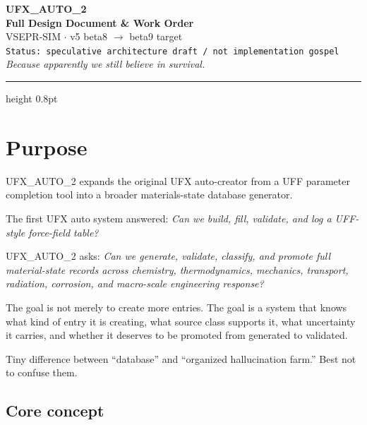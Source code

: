 \documentclass[11pt, a4paper]{article}
\begin{document}
\begin{center}
  {\LARGE\bfseries UFX\_AUTO\_2}\\[4pt]
  {\large\bfseries Full Design Document \& Work Order}\\[6pt]
  {\normalsize VSEPR-SIM $\cdot$ v5 beta8 $\rightarrow$ beta9 target}\\[3pt]
  {\small\texttt{Status: speculative architecture draft / not implementation gospel}}\\[3pt]
  {\small\textit{Because apparently we still believe in survival.}}
\end{center}

\vspace{4pt}
\hrule height 0.8pt
\vspace{10pt}

\tableofcontents
\newpage

\section{Purpose}

UFX\_AUTO\_2 expands the original UFX auto-creator from a UFF parameter completion tool into a broader materials-state database generator.

The first UFX auto system answered: \textit{Can we build, fill, validate, and log a UFF-style force-field table?}

UFX\_AUTO\_2 asks: \textit{Can we generate, validate, classify, and promote full material-state records across chemistry, thermodynamics, mechanics, transport, radiation, corrosion, and macro-scale engineering response?}

The goal is not merely to create more entries. The goal is a system that knows what kind of entry it is creating, what source class supports it, what uncertainty it carries, and whether it deserves to be promoted from generated to validated.

\begin{rulebox}
Tiny difference between ``database'' and ``organized hallucination farm.'' Best not to confuse them.
\end{rulebox}

\subsection{Core concept}
\end{document}
